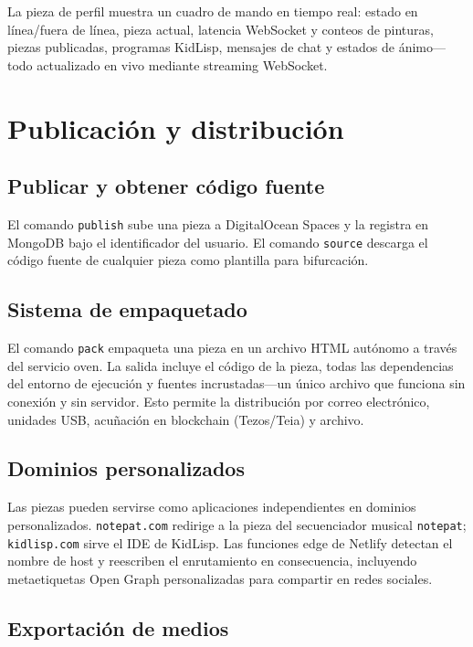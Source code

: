 \documentclass[10pt,letterpaper,twocolumn]{article}
\begin{document}
La pieza de perfil muestra un cuadro de mando en tiempo real: estado en línea/fuera de línea, pieza actual, latencia WebSocket y conteos de pinturas, piezas publicadas, programas KidLisp, mensajes de chat y estados de ánimo---todo actualizado en vivo mediante streaming WebSocket.


\section{Publicación y distribución}
\label{sec:publishing}

\subsection{Publicar y obtener código fuente}

El comando \texttt{publish} sube una pieza a DigitalOcean Spaces y la registra en MongoDB bajo el identificador del usuario. El comando \texttt{source} descarga el código fuente de cualquier pieza como plantilla para bifurcación.

\subsection{Sistema de empaquetado}

El comando \texttt{pack} empaqueta una pieza en un archivo HTML autónomo a través del servicio oven. La salida incluye el código de la pieza, todas las dependencias del entorno de ejecución y fuentes incrustadas---un único archivo que funciona sin conexión y sin servidor. Esto permite la distribución por correo electrónico, unidades USB, acuñación en blockchain (Tezos/Teia) y archivo.

\subsection{Dominios personalizados}

Las piezas pueden servirse como aplicaciones independientes en dominios personalizados. \texttt{notepat.com} redirige a la pieza del secuenciador musical \texttt{notepat}; \texttt{kidlisp.com} sirve el IDE de KidLisp. Las funciones edge de Netlify detectan el nombre de host y reescriben el enrutamiento en consecuencia, incluyendo metaetiquetas Open Graph personalizadas para compartir en redes sociales.

\subsection{Exportación de medios}
\end{document}
